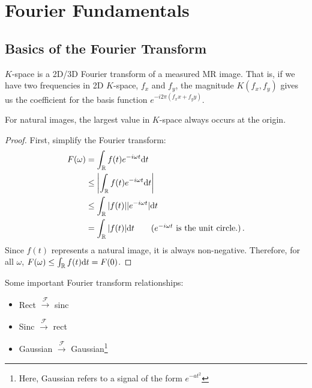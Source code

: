 \chapter{Fourier Fundamentals}

\section{Basics of the Fourier Transform}

\begin{defn}[$K$-space]
$K$-space is a 2D/3D Fourier transform of a measured MR image.
That is, if we have two frequencies in 2D $K$-space, $f_x$ and $f_y$, the magnitude $K(f_x, f_y)$ gives us the coefficient for the basis function $e^{-i 2\pi(f_x x + f_y y)}$.
\end{defn}

\begin{theorem}
For natural images, the largest value in $K$-space always occurs at the origin.
\end{theorem}
\begin{proof}
First, simplify the Fourier transform:
\begin{align*}
    F(\omega)
    &= \int_\R f(t) e^{-i\omega t} \d t \\
    &\leq \left| \int_\R f(t) e^{-i\omega t} \d t \right| \\
    &\leq \int_\R |f(t)| |e^{-i\omega t}| \d t \\
    &= \int_\R |f(t)| \d t \tag{$e^{-i\omega t}$ is the unit circle.} \,.
\end{align*}
Since $f(t)$ represents a natural image, it is always non-negative.
Therefore, for all $\omega$, $F(\omega) \leq \int_{\mathbb R} f(t) \mathrm d t = F(0)$.
\end{proof}

Some important Fourier transform relationships:
\begin{itemize}
    \item Rect $\stackrel{\mathcal F}{\longrightarrow}$ sinc
    \item Sinc $\stackrel{\mathcal F}{\longrightarrow}$ rect
    \item Gaussian $\stackrel{\mathcal F}{\longrightarrow}$ Gaussian\footnote{Here, Gaussian refers to a signal of the form $e^{-at^2}$}
\end{itemize}